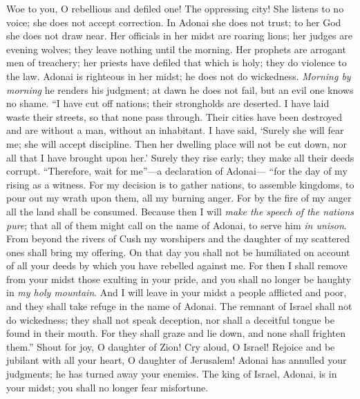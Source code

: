 \begin{biblechapter} %
 Woe to you, O rebellious and defiled one! 
The oppressing city!
\verse She listens to no voice; 
she does not accept correction. 
In Adonai she does not trust; 
to her God she does not draw near.
\verse Her officials in her midst are roaring lions; 
her judges are evening wolves; 
they leave nothing until the morning.
\verse Her prophets are arrogant men of treachery; 
her priests have defiled that which is holy; 
they do violence to the law.
\verse Adonai is righteous in her midst; 
he does not do wickedness. 
\textit{Morning by morning} he renders his judgment; 
at dawn he does not fail, 
but an evil one knows no shame.
\verse “I have cut off nations; 
their strongholds are deserted. 
I have laid waste their streets, 
so that none pass through. 
Their cities have been destroyed 
and are without a man, without an inhabitant.
\verse I have said, ‘Surely she will fear me; 
she will accept discipline. 
Then her dwelling place will not be cut down, 
nor all that I have brought upon her.’ 
Surely they rise early; 
they make all their deeds corrupt.
\verse “Therefore, wait for me”—a declaration of Adonai— 
“for the day of my rising as a witness. 
For my decision is to gather nations, 
to assemble kingdoms, 
to pour out my wrath upon them, all my burning anger. 
For by the fire of my anger all the land shall be consumed.
\verse Because then I will \textit{make the speech of the nations pure}; 
that all of them might call on the name of Adonai, 
to serve him \textit{in unison}.
\verse From beyond the rivers of Cush 
my worshipers and the daughter of my scattered ones 
shall bring my offering.
\verse On that day you shall not be humiliated 
on account of all your deeds 
by which you have rebelled against me. 
For then I shall remove from your midst 
those exulting in your pride, 
and you shall no longer be haughty 
in \textit{my holy mountain}.
\verse And I will leave in your midst 
a people afflicted and poor, 
and they shall take refuge 
in the name of Adonai.
\verse The remnant of Israel 
shall not do wickedness; 
they shall not speak deception, 
nor shall a deceitful tongue be found in their mouth. 
For they shall graze and lie down, 
and none shall frighten them.”
\verse Shout for joy, O daughter of Zion! 
Cry aloud, O Israel! 
Rejoice and be jubilant with all your heart, 
O daughter of Jerusalem!
\verse Adonai has annulled your judgments; 
he has turned away your enemies. 
The king of Israel, Adonai, is in your midst; 
you shall no longer fear misfortune.

\end{biblechapter}
